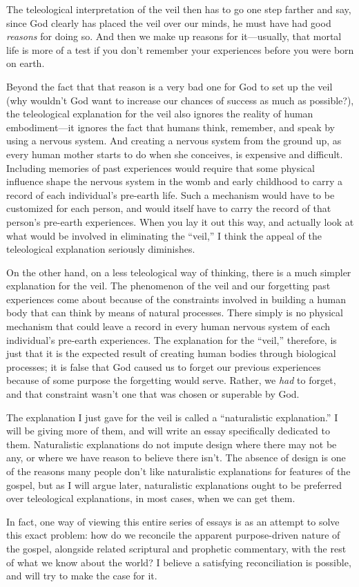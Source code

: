 		The teleological interpretation of the veil then has to go one step farther and say, since God clearly has placed the veil over our minds, he must have had good \textit{reasons} for doing so. And then we make up reasons for it---usually, that mortal life is more of a test if you don't remember your experiences before you were born on earth.
		
		Beyond the fact that that reason is a very bad one for God to set up the veil (why wouldn't God want to increase our chances of success as much as possible?), the teleological explanation for the veil also ignores the reality of human embodiment---it ignores the fact that humans think, remember, and speak by using a nervous system. And creating a nervous system from the ground up, as every human mother starts to do when she conceives, is expensive and difficult. Including memories of past experiences would require that some physical influence shape the nervous system in the womb and early childhood to carry a record of each individual's pre-earth life. Such a mechanism would have to be customized for each person, and would itself have to carry the record of that person's pre-earth experiences. When you lay it out this way, and actually look at what would be involved in eliminating the ``veil,'' I think the appeal of the teleological explanation seriously diminishes.
		
		On the other hand, on a less teleological way of thinking, there is a much simpler explanation for the veil. The phenomenon of the veil and our forgetting past experiences come about because of the constraints involved in building a human body that can think by means of natural processes. There simply is no physical mechanism that could leave a record in every human nervous system of each individual's pre-earth experiences. The explanation for the ``veil,'' therefore, is just that it is the expected result of creating human bodies through biological processes; it is false that God caused us to forget our previous experiences because of some purpose the forgetting would serve. Rather, we \textit{had} to forget, and that constraint wasn't one that was chosen or superable by God.
		
		The explanation I just gave for the veil is called a ``naturalistic explanation.'' I will be giving more of them, and will write an essay specifically dedicated to them. Naturalistic explanations do not impute design where there may not be any, or where we have reason to believe there isn't. The absence of design is one of the reasons many people don't like naturalistic explanations for features of the gospel, but as I will argue later, naturalistic explanations ought to be preferred over teleological explanations, in most cases, when we can get them.
		
		In fact, one way of viewing this entire series of essays is as an attempt to solve this exact problem: how do we reconcile the apparent purpose-driven nature of the gospel, alongside related scriptural and prophetic commentary, with the rest of what we know about the world? I believe a satisfying reconciliation is possible, and will try to make the case for it.